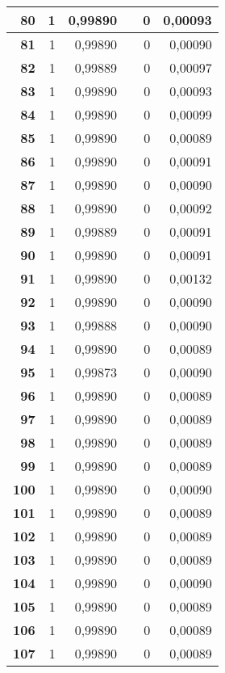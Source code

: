 {\begin{longtable}{|r|r|r|l|r|r|}
\textbf{80} & 1 & 0,99890 &  & 0 & 0,00093 \\ \hline
\textbf{81} & 1 & 0,99890 &  & 0 & 0,00090 \\ \hline
\textbf{82} & 1 & 0,99889 &  & 0 & 0,00097 \\ \hline
\textbf{83} & 1 & 0,99890 &  & 0 & 0,00093 \\ \hline
\textbf{84} & 1 & 0,99890 &  & 0 & 0,00099 \\ \hline
\textbf{85} & 1 & 0,99890 &  & 0 & 0,00089 \\ \hline
\textbf{86} & 1 & 0,99890 &  & 0 & 0,00091 \\ \hline
\textbf{87} & 1 & 0,99890 &  & 0 & 0,00090 \\ \hline
\textbf{88} & 1 & 0,99890 &  & 0 & 0,00092 \\ \hline
\textbf{89} & 1 & 0,99889 &  & 0 & 0,00091 \\ \hline
\textbf{90} & 1 & 0,99890 &  & 0 & 0,00091 \\ \hline
\textbf{91} & 1 & 0,99890 &  & 0 & 0,00132 \\ \hline
\textbf{92} & 1 & 0,99890 &  & 0 & 0,00090 \\ \hline
\textbf{93} & 1 & 0,99888 &  & 0 & 0,00090 \\ \hline
\textbf{94} & 1 & 0,99890 &  & 0 & 0,00089 \\ \hline
\textbf{95} & 1 & 0,99873 &  & 0 & 0,00090 \\ \hline
\textbf{96} & 1 & 0,99890 &  & 0 & 0,00089 \\ \hline
\textbf{97} & 1 & 0,99890 &  & 0 & 0,00089 \\ \hline
\textbf{98} & 1 & 0,99890 &  & 0 & 0,00089 \\ \hline
\textbf{99} & 1 & 0,99890 &  & 0 & 0,00089 \\ \hline
\textbf{100} & 1 & 0,99890 &  & 0 & 0,00090 \\ \hline
\textbf{101} & 1 & 0,99890 &  & 0 & 0,00089 \\ \hline
\textbf{102} & 1 & 0,99890 &  & 0 & 0,00089 \\ \hline
\textbf{103} & 1 & 0,99890 &  & 0 & 0,00089 \\ \hline
\textbf{104} & 1 & 0,99890 &  & 0 & 0,00090 \\ \hline
\textbf{105} & 1 & 0,99890 &  & 0 & 0,00089 \\ \hline
\textbf{106} & 1 & 0,99890 &  & 0 & 0,00089 \\ \hline
\textbf{107} & 1 & 0,99890 &  & 0 & 0,00089 \\ \hline

\end{longtable}}
